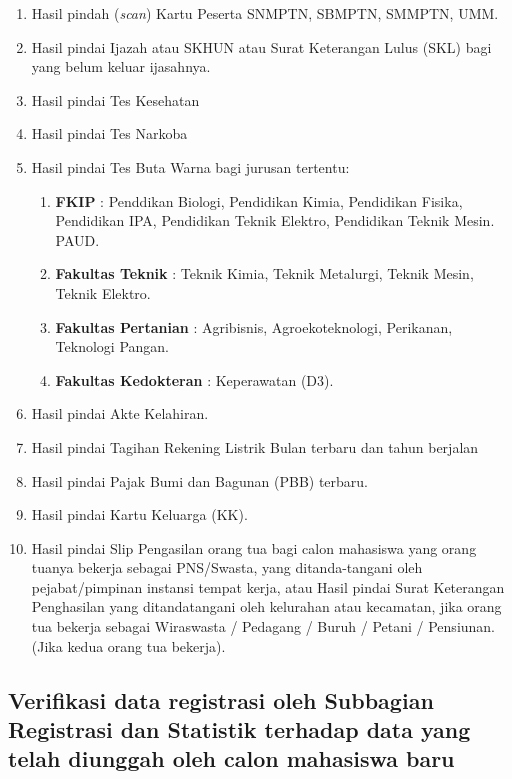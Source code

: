 \documentclass[
]{book}
\providecommand{\tightlist}{%
  \setlength{\itemsep}{0pt}\setlength{\parskip}{0pt}}
\begin{document}
\begin{enumerate}
\def\labelenumi{\alph{enumi}.}
\item
  Hasil pindah (\emph{scan}) Kartu Peserta SNMPTN, SBMPTN, SMMPTN, UMM.
\item
  Hasil pindai Ijazah atau SKHUN atau Surat Keterangan Lulus (SKL) bagi yang belum keluar ijasahnya.
\item
  Hasil pindai Tes Kesehatan
\item
  Hasil pindai Tes Narkoba
\item
  Hasil pindai Tes Buta Warna bagi jurusan tertentu:

  \begin{enumerate}
  \def\labelenumii{\arabic{enumii}.}
  \tightlist
  \item
    \textbf{FKIP} : Penddikan Biologi, Pendidikan Kimia, Pendidikan Fisika, Pendidikan IPA, Pendidikan Teknik Elektro, Pendidikan Teknik Mesin. PAUD.
  \item
    \textbf{Fakultas Teknik} : Teknik Kimia, Teknik Metalurgi, Teknik Mesin, Teknik Elektro.
  \item
    \textbf{Fakultas Pertanian} : Agribisnis, Agroekoteknologi, Perikanan, Teknologi Pangan.
  \item
    \textbf{Fakultas Kedokteran} : Keperawatan (D3).
  \end{enumerate}
\item
  Hasil pindai Akte Kelahiran.
\item
  Hasil pindai Tagihan Rekening Listrik Bulan terbaru dan tahun berjalan
\item
  Hasil pindai Pajak Bumi dan Bagunan (PBB) terbaru.
\item
  Hasil pindai Kartu Keluarga (KK).
\item
  Hasil pindai Slip Pengasilan orang tua bagi calon mahasiswa yang orang tuanya bekerja sebagai PNS/Swasta, yang ditanda-tangani oleh pejabat/pimpinan instansi tempat kerja, atau Hasil pindai Surat Keterangan Penghasilan yang ditandatangani oleh kelurahan atau kecamatan, jika orang tua bekerja sebagai Wiraswasta / Pedagang / Buruh / Petani / Pensiunan. (Jika kedua orang tua bekerja).
\end{enumerate}

\hypertarget{verifikasi-data-registrasi-oleh-subbagian-registrasi-dan-statistik-terhadap-data-yang-telah-diunggah-oleh-calon-mahasiswa-baru}{%
\subsection{Verifikasi data registrasi oleh Subbagian Registrasi dan Statistik terhadap data yang telah diunggah oleh calon mahasiswa baru}\label{verifikasi-data-registrasi-oleh-subbagian-registrasi-dan-statistik-terhadap-data-yang-telah-diunggah-oleh-calon-mahasiswa-baru}}
\end{document}
